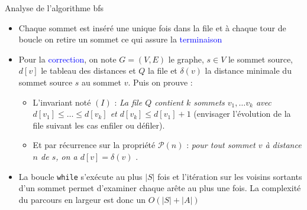 \documentclass[10pt]{beamer}
\begin{document}
\begin{frame}[fragile]{\Ctitle}{\stitle}
	\begin{block}{Analyse de l'algorithme {\sc bfs}}
		\begin{itemize}
			\item<2-> Chaque sommet est inséré une unique fois dans la file et à chaque tour de boucle on retire un sommet ce qui assure la \textcolor{blue}{terminaison}
			\item<3-> Pour la \textcolor{blue}{correction}, on note $G = (V,E)$ le graphe, $s \in V$ le sommet source, $d[v]$ le tableau des distances et $Q$ la file et $\delta(v)$ la distance minimale du sommet source $s$ au sommet $v$. Puis on prouve : 
			\begin{itemize}
				\item<4-> L'invariant noté $(I)$ : \og{}\textit{La file $Q$ contient $k$ sommets $v_1, \dots v_k$ avec $d[v_1] \leqslant \dots \leqslant d[v_k]$ et $d[v_k] \leqslant d[v_1] +1$} \fg{} (envisager l'évolution de la file suivant les cas enfiler ou défiler). 
				\item Et par récurrence sur la propriété $\mathcal{P}(n)$ : \og{}\textit{pour tout sommet $v$ à distance $n$ de $s$, on a $d[v]=\delta(v)$} \fg{}.
			\end{itemize} 
			\item<6-> La boucle {\tt while} s'exécute au plus $|S|$ fois et l'itération sur les voisins sortants d'un sommet permet d'examiner chaque arête au plus une fois. La complexité du parcours en largeur est donc un $O(|S|+|A|)$
		\end{itemize}
	\end{block}
\end{frame}
\end{document}
